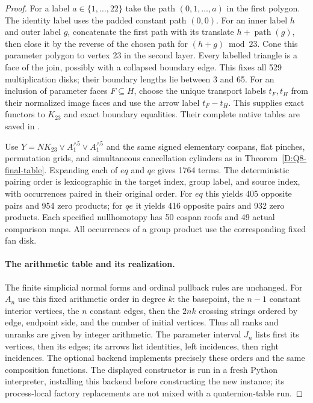 \begin{proof}
For a label $a\in\{1,\ldots,22\}$ take the path
$(0,1,\ldots,a)$ in the first polygon. The identity label uses
the padded constant path $(0,0)$. For an inner label $h$ and
outer label $g$, concatenate the first path with its translate
$h+\operatorname{path}(g)$, then close it by the reverse of the
chosen path for $(h+g)\bmod23$. Cone this parameter polygon to
vertex 23 in the second layer. Every labelled triangle is a face
of the join, possibly with a collapsed boundary edge. This fixes
all 529 multiplication disks; their boundary lengths lie between
3 and 65. For an inclusion of parameter faces $F\subseteq H$,
choose the unique transport labels $t_F,t_H$ from their normalized
image faces and use the arrow label $t_F-t_H$. This supplies exact
functors to $K_{23}$ and exact boundary equalities. Their complete
native tables are saved in
.

Use $Y=NK_{23}\vee A_1^{\wedge5}\vee A_1^{\wedge5}$ and the same
signed elementary cospans, flat pinches, permutation grids, and
simultaneous cancellation cylinders as in
Theorem~\ref{D:Q8-final-table}. Expanding each of $eq$ and $qe$
gives 1764 terms. The deterministic pairing order is lexicographic
in the target index, group label, and source index, with occurrences
paired in their original order. For $eq$ this yields 405 opposite
pairs and 954 zero products; for $qe$ it yields 416 opposite pairs
and 932 zero products. Each specified nullhomotopy has 50 cospan
roofs and 49 actual comparison maps. All occurrences of a group
product use the corresponding fixed fan disk.

\paragraph{The arithmetic table and its realization.}
The finite simplicial normal forms and ordinal pullback rules are
unchanged. For $A_n$ use this fixed arithmetic order in degree $k$:
the basepoint, the $n-1$ constant interior vertices, the $n$ constant
edges, then the $2nk$ crossing strings ordered by edge, endpoint
side, and the number of initial vertices. Thus all ranks and
unranks are given by integer arithmetic. The parameter interval
$J_n$ lists first its vertices, then its edges; its arrows list
identities, left incidences, then right incidences. The optional
backend  implements precisely
these orders and the same composition functions. The displayed
constructor is run in a fresh Python interpreter, installing this
backend before constructing the new instance; its process-local
factory replacements are not mixed with a quaternion-table run.


\end{proof}
